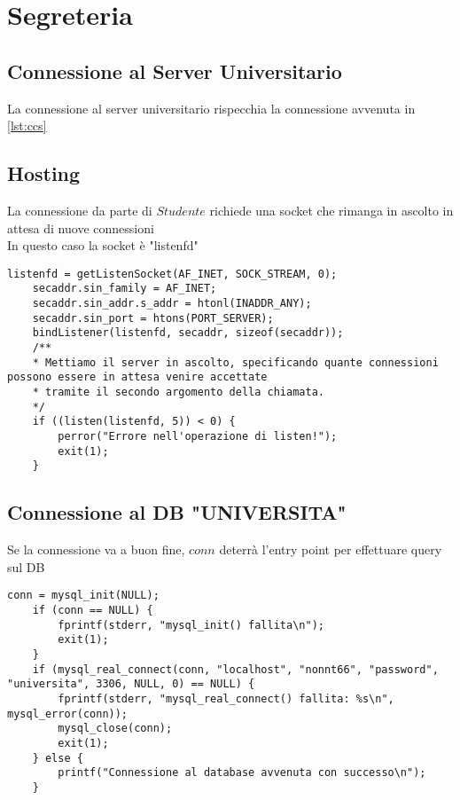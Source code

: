 \newpage
\section{Segreteria}
\subsection{Connessione al Server Universitario}
La connessione al server universitario rispecchia la connessione avvenuta in \ref{lst:ccs}

\subsection{Hosting}
La connessione da parte di $Studente$ richiede una socket che rimanga in ascolto in attesa di nuove connessioni\\
In questo caso la socket è "listenfd"\\
 \begin{lstlisting}[caption=Codice Ascolto Socket, label=lst:cass]
 	listenfd = getListenSocket(AF_INET, SOCK_STREAM, 0);
 	secaddr.sin_family = AF_INET;
 	secaddr.sin_addr.s_addr = htonl(INADDR_ANY);
 	secaddr.sin_port = htons(PORT_SERVER);
 	bindListener(listenfd, secaddr, sizeof(secaddr));
 	/**
 	* Mettiamo il server in ascolto, specificando quante connessioni possono essere in attesa venire accettate
 	* tramite il secondo argomento della chiamata.
 	*/
 	if ((listen(listenfd, 5)) < 0) {
 		perror("Errore nell'operazione di listen!");
 		exit(1);
 	}
 \end{lstlisting}
 \newpage
\subsection{Connessione al DB "UNIVERSITA"}
Se la connessione va a buon fine, $conn$ deterrà l'entry point per effettuare query sul DB\\
\begin{lstlisting}[caption=Codice Connessione DB, label=lst:ccdb]
	conn = mysql_init(NULL);
	if (conn == NULL) {
		fprintf(stderr, "mysql_init() fallita\n");
		exit(1);
	}
	if (mysql_real_connect(conn, "localhost", "nonnt66", "password", "universita", 3306, NULL, 0) == NULL) {
		fprintf(stderr, "mysql_real_connect() fallita: %s\n", mysql_error(conn));
		mysql_close(conn);
		exit(1);
	} else {
		printf("Connessione al database avvenuta con successo\n");
	}
\end{lstlisting}
\newpage


